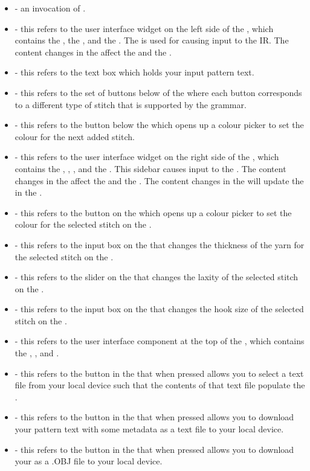 \documentclass[main.tex]{subfiles}
\begin{document}
\begin{itemize}
\item {} - an invocation of \CC.
\item \PatSidebar* - this refers to the user interface widget on the left side of the \CRW, which contains the \PTI, the \ASBs, and the \NCSB. The \PatSidebar{} is used for causing input to the IR. The content changes in the \PatSidebar{} affect the \RM{} and the \CRW.
\item \PTI* - this refers to the text box which holds your input pattern text.
\item \ASBs* - this refers to the set of buttons below of the \PTI{} where each button corresponds to a different type of stitch that is supported by the grammar.
\item \NCSB* - this refers to the button below the \ASBs{} which opens up a colour picker to set the colour for the next added stitch.
\item \PropSidebar* - this refers to the user interface widget on the right side of the \CRW, which contains the \YCP, \YTS, \SLS, and the \HSS. This sidebar causes input to the \IR. The content changes in the \PropSidebar{} affect the \RM{} and the \CRW. The content changes in the \PropSidebar{} will update the \PTI{} in the \PatSidebar{}.
\item \YCP* - this refers to the button on the \PropSidebar{} which opens up a colour picker to set the colour for the selected stitch on the \RM.
\item \YTS* - this refers to the input box on the \PropSidebar{} that changes the thickness of the yarn for the selected stitch on the \RM.
\item \SLS* - this refers to the slider on the \PropSidebar{} that changes the laxity of the selected stitch on the \RM.
\item \HSS* - this refers to the input box on the \PropSidebar{} that changes the hook size of the selected stitch on the \RM.
\item \MenuBar* - this refers to the user interface component at the top of the \CRW, which contains the \UB, \DB, and \EB.
\item \UB* - this refers to the button in the \MenuBar{} that when pressed allows you to select a text file from your local device such that the contents of that text file populate the \PTI.
\item \DB* - this refers to the button in the \MenuBar{} that when pressed allows you to download your pattern text with some metadata as a text file to your local device.
\item \EB* - this refers to the button in the \MenuBar{} that when pressed allows you to download your \RM{} as a .OBJ file to your local device.

\end{itemize}
\end{document}
